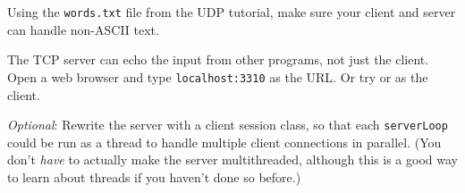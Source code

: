 
\STEP Using the \texttt{words.txt} file from the UDP tutorial, make sure
your client and server can handle non-ASCII text.

The TCP server can echo the input from other programs, not just the client.
Open a web browser and type \texttt{localhost:3310} as the URL.
Or try  or  as the client. 

\emph{Optional}: Rewrite the server with a client session class, so that
each \texttt{serverLoop}
could be run as a thread to handle multiple client connections in parallel.
(You don't \emph{have} to actually make the server multithreaded, although
this is a good way to learn about threads if you haven't done so before.)


\COPYRIGHT


